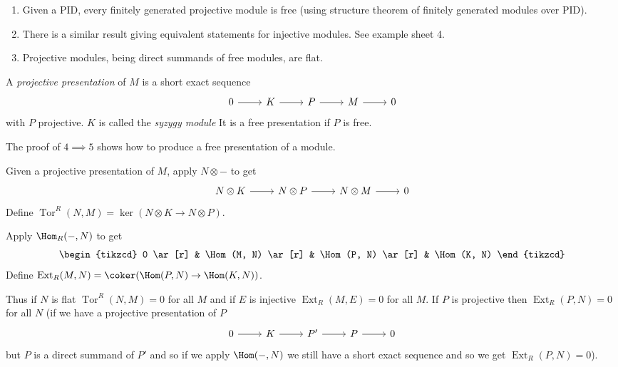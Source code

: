 \documentclass[a4paper]{article}
\DeclareMathOperator{\Tor}{Tor}
\DeclareMathOperator{\Ext}{Ext}
\begin{document}
\begin{remark}\leavevmode
  \begin{enumerate}
  \item Given a PID, every finitely generated projective module is free (using structure theorem of finitely generated modules over PID).
  \item There is a similar result giving equivalent statements for injective modules. See example sheet 4.
  \item Projective modules, being direct summands of free modules, are flat.
  \end{enumerate}
\end{remark}

\begin{definition}
  A \emph{projective presentation} of \(M\) is a short exact sequence
  \[
    \begin{tikzcd}
      0 \ar[r] & K \ar[r] & P \ar[r] & M \ar[r] & 0
    \end{tikzcd}
  \]
  with \(P\) projective. \(K\) is called the \emph{syzygy module} It is a free presentation if \(P\) is free.
\end{definition}

\begin{remark}
  The proof of \(4 \implies 5\) shows how to produce a free presentation of a module.
\end{remark}

\begin{definition}
  Given a projective presentation of \(M\), apply \(N \otimes -\) to get
  \[
    \begin{tikzcd}
      N \otimes K \ar[r] & N \otimes P \ar[r] & N \otimes M \ar[r] & 0
    \end{tikzcd}
  \]
  Define \(\Tor^R(N, M) = \ker (N \otimes K \to N \otimes P)\).

  Apply \(\Hom_R(-, N)\) to get
  \[
    \begin{tikzcd}
      0 \ar[r] & \Hom(M, N) \ar[r] & \Hom(P, N) \ar[r] & \Hom(K, N)
    \end{tikzcd}
  \]
  Define \(\Ext_R(M, N) = \coker(\Hom(P, N) \to \Hom(K, N))\).
\end{definition}

Thus if \(N\) is flat \(\Tor^R(N, M) = 0\) for all \(M\) and if \(E\) is injective \(\Ext_R(M, E) = 0\) for all \(M\). If \(P\) is projective then \(\Ext_R(P, N) = 0\) for all \(N\) (if we have a projective presentation of \(P\)
\[
  \begin{tikzcd}
    0 \ar[r] & K \ar[r] & P' \ar[r] & P \ar[r] & 0
  \end{tikzcd}
\]
but \(P\) is a direct summand of \(P'\) and so if we apply \(\Hom(-, N)\) we still have a short exact sequence and so we get \(\Ext_R(P, N) = 0\)).
\end{document}
